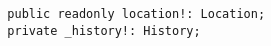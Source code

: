 \begin{verbatim}
  public readonly location!: Location;
  private _history!: History;
\end{verbatim}
